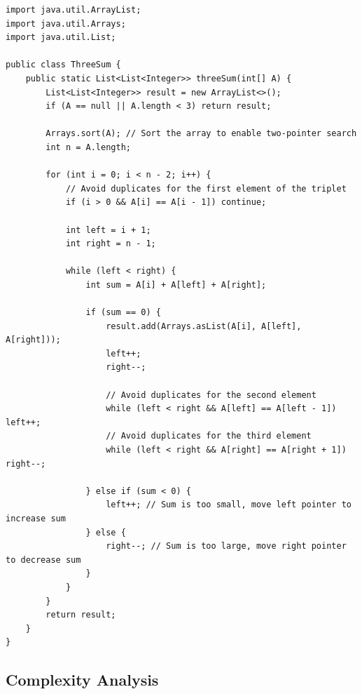 \documentclass[10pt,journal,compsoc,onecolumn]{IEEEtran}
\begin{document}
\begin{verbatim}
import java.util.ArrayList;
import java.util.Arrays;
import java.util.List;

public class ThreeSum {
    public static List<List<Integer>> threeSum(int[] A) {
        List<List<Integer>> result = new ArrayList<>();
        if (A == null || A.length < 3) return result;
        
        Arrays.sort(A); // Sort the array to enable two-pointer search
        int n = A.length;
        
        for (int i = 0; i < n - 2; i++) {
            // Avoid duplicates for the first element of the triplet
            if (i > 0 && A[i] == A[i - 1]) continue;
            
            int left = i + 1;
            int right = n - 1;
            
            while (left < right) {
                int sum = A[i] + A[left] + A[right];
                
                if (sum == 0) {
                    result.add(Arrays.asList(A[i], A[left], A[right]));
                    left++;
                    right--;
                    
                    // Avoid duplicates for the second element
                    while (left < right && A[left] == A[left - 1]) left++;
                    // Avoid duplicates for the third element
                    while (left < right && A[right] == A[right + 1]) right--;
                    
                } else if (sum < 0) {
                    left++; // Sum is too small, move left pointer to increase sum
                } else {
                    right--; // Sum is too large, move right pointer to decrease sum
                }
            }
        }
        return result;
    }
}
\end{verbatim}

\subsection{Complexity Analysis}
\end{document}
